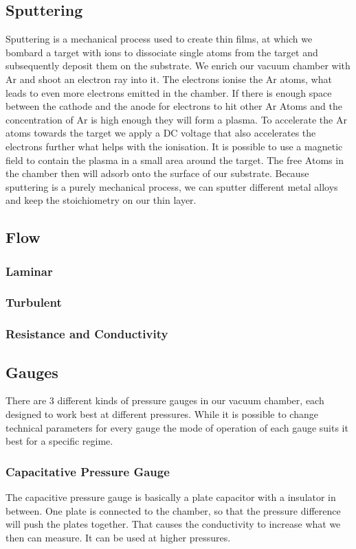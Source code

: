 \documentclass[]{article}
\begin{document}
\subsection{Sputtering}
Sputtering is a mechanical process used to create thin films, at which we bombard a target with ions to dissociate single atoms from the target and subsequently deposit them on the substrate. We enrich our vacuum chamber with Ar and shoot an electron ray into it. The electrons ionise the Ar atoms, what leads to even more electrons emitted in the chamber. If there is enough space between the cathode and the anode for electrons to hit other Ar Atoms and the concentration of Ar is high enough they will form a plasma. To accelerate the Ar atoms towards the target we apply a DC voltage that also accelerates the electrons further what helps with the ionisation. It is possible to use a magnetic field to contain the plasma in a small area around the target. The free Atoms in the chamber then will adsorb onto the surface of our substrate. Because sputtering is a purely mechanical process, we can sputter different metal alloys and keep the stoichiometry on our thin layer.
\subsection{Flow}
\subsubsection{Laminar}
\subsubsection{Turbulent}
\subsubsection{Resistance and Conductivity}
\subsection{Gauges}
There are 3 different kinds of pressure gauges in our vacuum chamber, each designed to work best at different pressures. While it is possible to change technical parameters for every gauge the mode of operation of each gauge suits it best for a specific regime.
\subsubsection[Capacitive]{Capacitative Pressure Gauge}
The capacitive pressure gauge is basically a plate capacitor with a insulator in between. One plate is connected to the chamber, so that the pressure difference will push the plates together. That causes the conductivity to increase what we then can measure. It can be used at higher pressures. 
\end{document}
